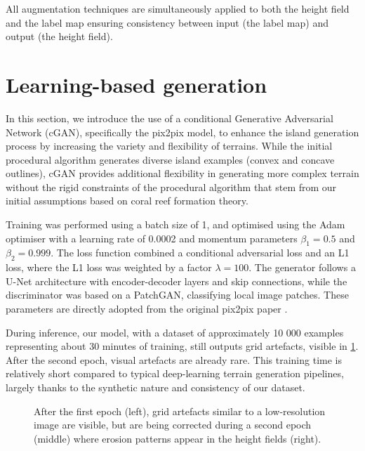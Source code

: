 All augmentation techniques are simultaneously applied to both the height field and the label map ensuring consistency between input (the label map) and output (the height field).

\section{Learning-based generation}
\label{sec:coral-island-cGAN-training}

In this section, we introduce the use of a conditional Generative Adversarial Network (cGAN), specifically the pix2pix model, to enhance the island generation process by increasing the variety and flexibility of terrains. While the initial procedural algorithm generates diverse island examples (convex and concave outlines), cGAN provides additional flexibility in generating more complex terrain without the rigid constraints of the procedural algorithm that stem from our initial assumptions based on coral reef formation theory.

Training was performed using a batch size of 1, and optimised using the Adam optimiser with a learning rate of 0.0002 and momentum parameters $\beta_1 = 0.5$ and $\beta_2 = 0.999$. The loss function combined a conditional adversarial loss and an L1 loss, where the L1 loss was weighted by a factor $\lambda = 100$. The generator follows a U-Net architecture with encoder-decoder layers and skip connections, while the discriminator was based on a PatchGAN, classifying local image patches. These parameters are directly adopted from the original pix2pix paper \cite{Isola2017}.

During inference, our model, with a dataset of approximately 10 000 examples representing about 30 minutes of training, still outputs grid artefacts, visible in \cref{fig:coral-island-first-epoch}. After the second epoch, visual artefacts are already rare. This training time is relatively short compared to typical deep-learning terrain generation pipelines, largely thanks to the synthetic nature and consistency of our dataset.

\begin{figure}[t]
    \caption{After the first epoch (left), grid artefacts similar to a low-resolution image are visible, but are being corrected during a second epoch (middle) where erosion patterns appear in the height fields (right).}
    \label{fig:coral-island-first-epoch}
\end{figure}

